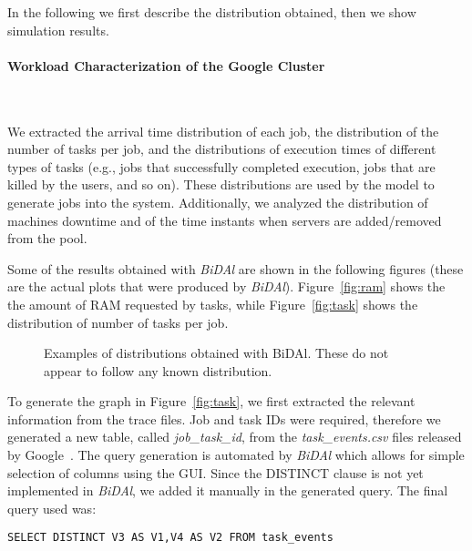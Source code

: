 \documentclass{article}
\begin{document}
In the following we first describe the distribution obtained, then we show simulation results.


\paragraph{Workload Characterization of the Google Cluster}
~

We extracted the arrival time distribution of each job, the distribution of the number of tasks per job, and the distributions of execution times of different types of tasks (e.g., jobs that successfully completed execution, jobs that are killed by the users, and so on). These distributions are used by the model to generate jobs into the system. Additionally, we analyzed the distribution of machines downtime and of the time instants when servers are added/removed from the pool.
 
Some of the results obtained with \emph{BiDAl} are shown in the following figures (these are the actual plots that were produced by \emph{BiDAl}). Figure~\ref{fig:ram} shows the the amount of RAM requested by tasks, while Figure~\ref{fig:task}  shows the distribution of number of tasks per job. 


\begin{figure}
\centering
{}
 \qquad
\caption{Examples of distributions obtained with BiDAl. These do not appear to follow any known distribution.}      
\end{figure}



To generate the graph in Figure~\ref{fig:task}, we first extracted the relevant information from the trace files.  Job and task IDs were required, therefore we generated a new table, called \emph{job\_task\_id}, from the \emph{task\_events.csv} files released by Google~\cite{googleData}. The query generation is automated by \emph{BiDAl} which allows for simple selection of columns using the GUI. Since the DISTINCT clause is not yet implemented in \emph{BiDAl}, we added it manually in the generated query.  The final query used was:

{\footnotesize \begin{verbatim}SELECT DISTINCT V3 AS V1,V4 AS V2 FROM task_events \end{verbatim}}
\end{document}
